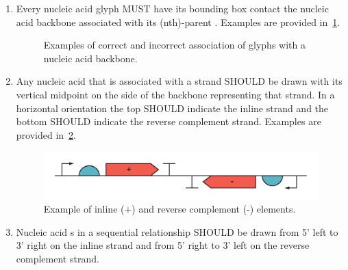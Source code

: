 \begin{enumerate}
\item Every nucleic acid  glyph MUST have its bounding box contact the nucleic acid backbone associated with its (nth)-parent . 
	Examples are provided in~\ref{exa:2a}.
   	\begin{figure}[h!]
	\centering
	\caption{Examples of correct and incorrect association of glyphs with a nucleic acid backbone.}
	\label{exa:2a}
	\end{figure}

		
\item Any nucleic acid  that is associated with a strand SHOULD be drawn
	with its vertical midpoint on the side of the backbone representing that strand.
	In a horizontal orientation the top SHOULD indicate the inline strand and the bottom
	SHOULD indicate the reverse complement strand.
	Examples are provided in~\ref{exa:2b}.
	\begin{figure}[h!]
	\centering
	\includegraphics[width=6in]{figures/examples/2b.pdf}
	\caption{Example of inline (+) and reverse complement (-) elements.}
	\label{exa:2b}
	\end{figure} 

\item Nucleic acid s in a sequential relationship SHOULD be drawn from 5' left to 3' right on the inline strand and from 5' right to 3' left on the reverse complement strand.


\end{enumerate}
